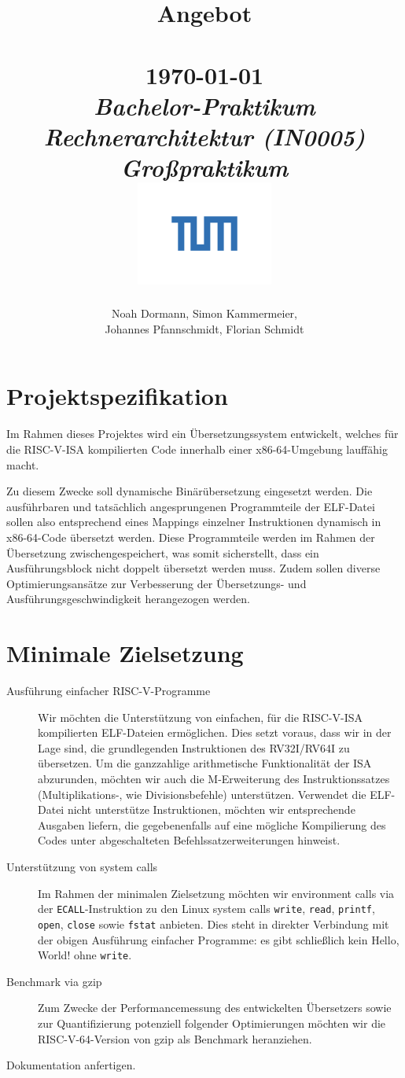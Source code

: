 \documentclass{article}
\title{
    \vspace{2in}
    \textmd{\textbf{Angebot\\\titleOfDocument}}\\
    \normalsize\vspace{0.1in}\small{\today}\\
    \vspace{0.1in}\large{\textit{Bachelor-Praktikum Rechnerarchitektur (IN0005)\\Großpraktikum}}
    \vspace{2in}
    \centering\\
    \includegraphics[width=4.5cm]{images/tum}
}
\author{Noah Dormann, Simon Kammermeier,\\Johannes Pfannschmidt, Florian Schmidt}
\date{}
\begin{document}
\maketitle
\thispagestyle{empty}
\pagebreak

\section*{Projektspezifikation}
Im Rahmen dieses Projektes wird ein Übersetzungssystem entwickelt, welches für die RISC-V-ISA kompilierten Code innerhalb einer x86-64-Umgebung lauffähig macht.

Zu diesem Zwecke soll dynamische Binärübersetzung eingesetzt werden. Die ausführbaren und tatsächlich angesprungenen Programmteile der ELF-Datei sollen also entsprechend eines Mappings einzelner Instruktionen dynamisch in x86-64-Code übersetzt werden. Diese Programmteile werden im Rahmen der Übersetzung zwischengespeichert, was somit sicherstellt, dass ein Ausführungsblock nicht doppelt übersetzt werden muss. Zudem sollen diverse Optimierungsansätze zur Verbesserung der Übersetzungs- und Ausführungsgeschwindigkeit herangezogen werden.

\section*{Minimale Zielsetzung}
\begin{description}
	\item[Ausführung einfacher RISC-V-Programme] Wir möchten die Unterstützung von einfachen, für die RISC-V-ISA kompilierten ELF-Dateien ermöglichen. Dies setzt voraus, dass wir in der Lage sind, die grundlegenden Instruktionen des RV32I/RV64I zu übersetzen. Um die ganzzahlige arithmetische Funktionalität der ISA abzurunden, möchten wir auch die M-Erweiterung des Instruktionssatzes (Multiplikations-, wie Divisionsbefehle) unterstützen. Verwendet die ELF-Datei nicht unterstütze Instruktionen, möchten wir entsprechende Ausgaben liefern, die gegebenenfalls auf eine mögliche Kompilierung des Codes unter abgeschalteten Befehlssatzerweiterungen hinweist.
	\item[Unterstützung von system calls] Im Rahmen der minimalen Zielsetzung möchten wir environment calls via der \verb!ECALL!-Instruktion zu den Linux system calls \verb!write!, \verb!read!, \verb!printf!, \verb!open!, \verb!close! sowie \verb!fstat! anbieten. Dies steht in direkter Verbindung mit der obigen Ausführung einfacher Programme: es gibt schließlich kein \glqq Hello, World!\grqq{} ohne \verb!write!.
	\item[Benchmark via gzip] Zum Zwecke der Performancemessung des entwickelten Übersetzers sowie zur Quantifizierung potenziell folgender Optimierungen möchten wir die RISC-V-64-Version von gzip als Benchmark heranziehen.
	\item[Dokumentation anfertigen.]
\end{description}
\end{document}
